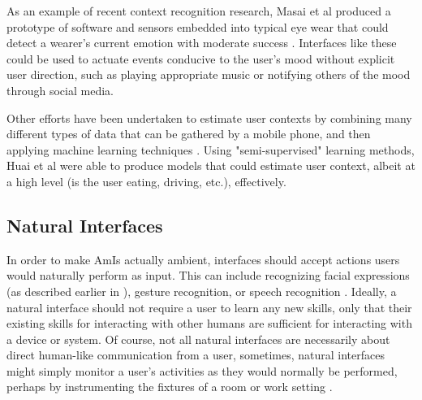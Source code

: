 \documentclass{article}
\begin{document}
As an example of recent context recognition research, Masai et al produced a prototype of software and sensors embedded into typical eye wear that could detect a wearer's current emotion with moderate success \cite{Masai:2016:FER:2856767.2856770}. Interfaces like these could be used to actuate events conducive to the user's mood without explicit user direction, such as playing appropriate music or notifying others of the mood through social media.

Other efforts have been undertaken to estimate user contexts by combining many different types of data that can be gathered by a mobile phone, and then applying machine learning techniques \cite{Huai:2014:TPC:2672614.2629504}. Using "semi-supervised" learning methods, Huai et al were able to produce models that could estimate user context, albeit at a high level (is the user eating, driving, etc.), effectively.

%
\subsection{Natural Interfaces}
In order to make AmIs actually ambient, interfaces should accept actions users would naturally perform as input. This can include recognizing facial expressions (as described earlier in \cite{Huai:2014:TPC:2672614.2629504}), gesture recognition, or speech recognition  \cite{Cook2009277}. Ideally, a natural interface should not require a user to learn any new skills, only that their existing skills for interacting with other humans are sufficient for interacting with a device or system. Of course, not all natural interfaces are necessarily about direct human-like communication from a user, sometimes, natural interfaces might simply monitor a user's activities as they would normally be performed, perhaps by instrumenting the fixtures of a room or work setting \cite{Baharin:2015:SSI:2798442.2754165}.
\end{document}
